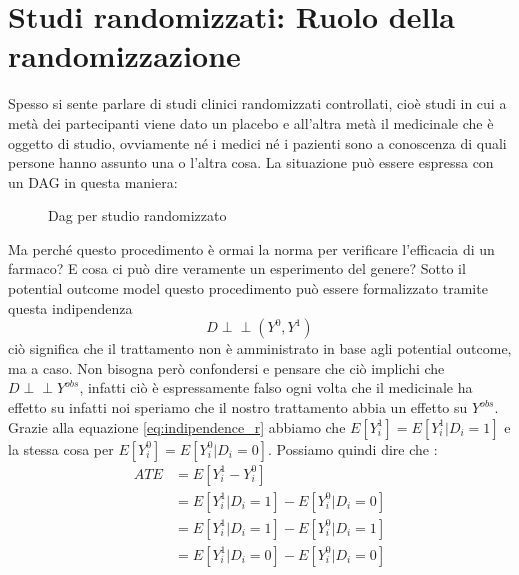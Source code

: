 \section{Studi randomizzati: Ruolo della randomizzazione}
Spesso si sente parlare di studi clinici randomizzati controllati, cioè studi in cui a metà dei partecipanti viene dato un placebo e all'altra metà il medicinale che è oggetto di studio, ovviamente né i medici né i pazienti sono a conoscenza di quali persone hanno assunto una o l'altra cosa. La situazione può essere espressa con un DAG in questa maniera: 
\begin{figure}[H]
\centering
\caption{Dag per studio randomizzato}
\label{fig:dag_random_EX}
\end{figure}
Ma perché questo procedimento è ormai la norma per verificare l'efficacia di un farmaco? E cosa ci può dire veramente un esperimento del genere? Sotto il potential outcome model questo procedimento può essere formalizzato tramite questa indipendenza
\begin{equation}
D \perp\!\!\!\perp (Y^{0},Y^{1})
\label{eq:indipendence_r}
\end{equation}
ciò significa che il trattamento non è amministrato in base agli potential outcome, ma a caso. Non bisogna però confondersi e pensare che ciò implichi che $D \perp\!\!\!\perp Y^{obs}$, infatti ciò è espressamente falso ogni volta che il medicinale ha effetto su infatti noi speriamo che il nostro trattamento abbia un effetto su $Y^{obs}$.
Grazie alla equazione \ref{eq:indipendence_r} abbiamo che $E[Y^1_i] = E[Y^{1}_i | D_i = 1]  $ e la stessa cosa per $E[Y^0_i] = E[Y^{0}_i | D_i = 0] $.
Possiamo quindi dire che :
\begin{align}
ATE &= E[Y^1_i-Y^0_i ] \\ 
 &= E[Y^{1}_i | D_i = 1]- E[Y^{0}_i | D_i = 0]\label{eq:ATE_R} \\
	& =E[Y^{1}_i | D_i = 1]- E[Y^{0}_i | D_i = 1] \label{eq:ATT_R} \\
 &= E[Y^{1}_i | D_i = 0]- E[Y^{0}_i | D_i = 0] \label{eq:ATU_R}
  \end{align}

